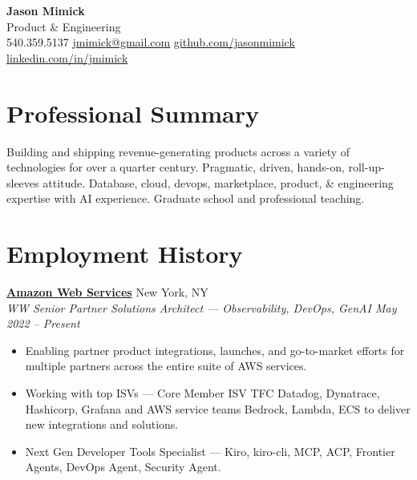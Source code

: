 \documentclass[10pt,letterpaper]{article}
\begin{document}
\begin{center}
{\fontsize{22}{26}\selectfont\bfseries\color{accent} Jason Mimick}\\[4pt]
{\normalsize\color{lighttext} Product \& Engineering}\\[8pt]
{\small\color{lighttext}
540.359.5137 \enspace\textbar\enspace
\href{mailto:jmimick@gmail.com}{jmimick@gmail.com} \enspace\textbar\enspace
\href{https://github.com/jasonmimick}{github.com/jasonmimick} \enspace\textbar\enspace
\href{https://www.linkedin.com/in/jmimick}{linkedin.com/in/jmimick}}
\end{center}

\vspace{2pt}

\section{Professional Summary}
{\small Building and shipping revenue-generating products across a variety of technologies for over a quarter century.
Pragmatic, driven, hands-on, roll-up-sleeves attitude.
Database, cloud, devops, marketplace, product, \& engineering expertise with AI experience.
Graduate school and professional teaching.}

\section{Employment History}

\textbf{\href{https://aws.amazon.com/}{Amazon Web Services}} \hfill {\small\color{lighttext} New York, NY}\\
{\small\itshape\color{accent} WW Senior Partner Solutions Architect --- Observability, DevOps, GenAI \hfill May 2022 -- Present}
\begin{itemize}
\item {\small Enabling partner product integrations, launches, and go-to-market efforts for multiple partners across the entire suite of AWS services.}
\item {\small Working with top ISVs --- Core Member ISV TFC Datadog, Dynatrace, Hashicorp, Grafana and AWS service teams Bedrock, Lambda, ECS to deliver new integrations and solutions.}
\item {\small Next Gen Developer Tools Specialist --- Kiro, kiro-cli, MCP, ACP, Frontier Agents, DevOps Agent, Security Agent.}
\end{itemize}
\end{document}
